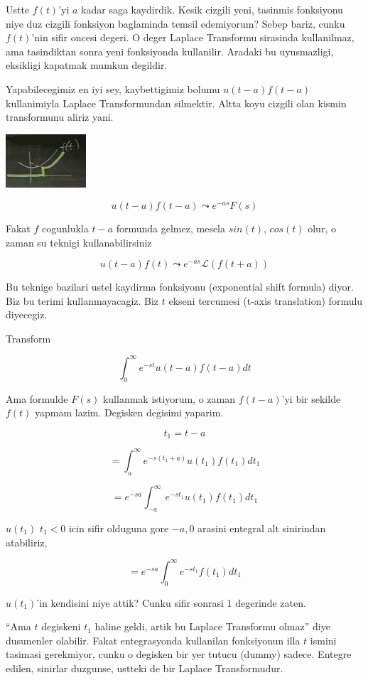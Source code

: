 \documentclass[12pt,fleqn]{article}
\begin{document}
Ustte $f(t)$'yi $a$ kadar saga kaydirdik. Kesik cizgili yeni, tasinmis
fonksiyonu niye duz cizgili fonksiyon baglaminda temsil edemiyorum? Sebep
bariz, cunku $f(t)$'nin sifir oncesi degeri. O deger Laplace Transformu
sirasinda kullanilmaz, ama tasindiktan sonra yeni fonksiyonda
kullanilir. Aradaki bu uyusmazligi, eksikligi kapatmak mumkun degildir. 

Yapabilecegimiz en iyi sey, kaybettigimiz bolumu $u(t-a)f(t-a)$ kullanimiyla
Laplace Transformundan silmektir. Altta koyu cizgili olan kismin
transformunu aliriz yani.

\includegraphics[height=2cm]{22_8.png}

\[ u(t-a)f(t-a) \leadsto e^{-as}F(s) \]

Fakat $f$ cogunlukla $t-a$ formunda gelmez, mesela $sin(t)$, $cos(t)$
olur, o zaman su teknigi kullanabilirsiniz

\[ u(t-a)f(t) \leadsto e^{-as}\mathcal{L}(f(t+a)) \]

Bu teknige bazilari ustel kaydirma fonksiyonu (exponential shift formula)
diyor. Biz bu terimi kullanmayacagiz. Biz $t$ ekseni tercumesi (t-axis
translation) formulu diyecegiz. 

Transform

\[ \int_{0}^{\infty}e^{-st}u(t-a)f(t-a) dt \]


Ama formulde $F(s)$ kullanmak istiyorum, o zaman $f(t-a)$'yi bir sekilde
$f(t)$ yapmam lazim. Degisken degisimi yaparim. 

\[ t_1 = t-a \]

\[ = \int_{a}^{\infty}e^{-s(t_1+a)}u(t_1)f(t_1) dt_1 \]

\[ = e^{-sa} \int_{-a}^{\infty}e^{-st_1}u(t_1)f(t_1) dt_1 \]

$u(t_1)$ $t_1<0$ icin sifir olduguna gore $-a,0$ arasini entegral alt
sinirindan atabiliriz, 

\[ = e^{-sa} \int_{0}^{\infty}e^{-st_1}f(t_1) dt_1 \]

$u(t_1)$'in kendisini niye attik? Cunku sifir sonrasi 1 degerinde zaten. 

``Ama $t$ degiskeni $t_1$ haline geldi, artik bu Laplace Transformu olmaz''
diye dusunenler olabilir. Fakat entegrasyonda kullanilan fonksiyonun illa
$t$ ismini tasimasi gerekmiyor, cunku o degisken bir yer tutucu (dummy)
sadece. Entegre edilen, sinirlar duzgunse, ustteki de bir Laplace
Transformudur.
\end{document}

